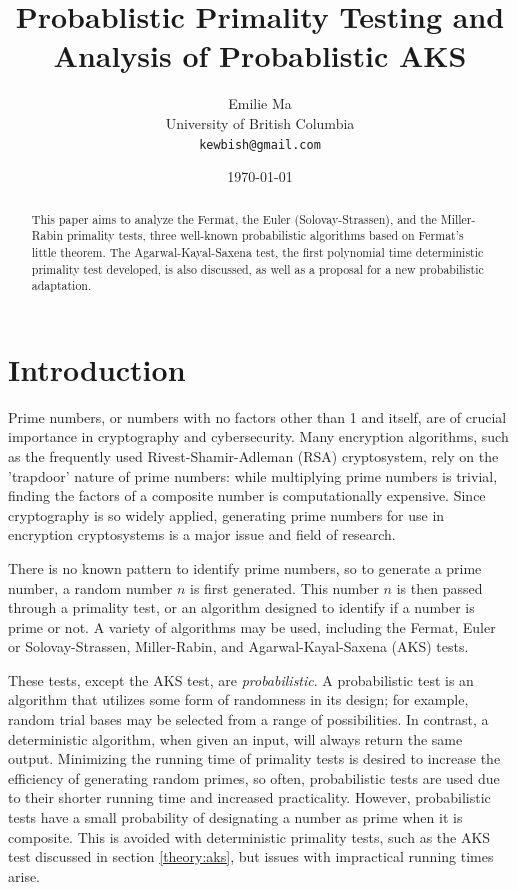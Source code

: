 \documentclass{article}
\title[Primality Testing]{Probablistic Primality Testing and Analysis of Probablistic AKS}
\author[Emilie Ma]{%
Emilie Ma\\%
University of British Columbia\\%
\texttt{kewbish@gmail.com}%
}
\date{\today}
\begin{document}
\maketitle
\newpage
\begin{abstract}
    This paper aims to analyze the Fermat, the Euler (Solovay-Strassen), and the Miller-Rabin primality tests, three well-known probabilistic algorithms based on Fermat's little theorem. The Agarwal-Kayal-Saxena test, the first polynomial time deterministic primality test developed, is also discussed, as well as a proposal for a new probabilistic adaptation.
\end{abstract}

\section{Introduction}
Prime numbers, or numbers with no factors other than 1 and itself, are of crucial importance in cryptography and cybersecurity. Many encryption algorithms, such as the frequently used Rivest-Shamir-Adleman (RSA) cryptosystem, rely on the 'trapdoor' nature of prime numbers: while multiplying prime numbers is trivial, finding the factors of a composite number is computationally expensive. 
Since cryptography is so widely applied, generating prime numbers for use in encryption cryptosystems is a major issue and field of research.

There is no known pattern to identify prime numbers, so to generate a prime number, a random number $n$ is first generated. This number $n$ is then passed through a primality test, or an algorithm designed to identify if a number is prime or not. A variety of algorithms may be used, including the Fermat, Euler or Solovay-Strassen, Miller-Rabin, and Agarwal-Kayal-Saxena (AKS) tests.

These tests, except the AKS test, are \emph{probabilistic}. A probabilistic test is an algorithm that utilizes some form of randomness in its design; for example, random trial bases may be selected from a range of possibilities. In contrast, a deterministic algorithm, when given an input, will always return the same output. Minimizing the running time of primality tests is desired to increase the efficiency of generating random primes, so often, probabilistic tests are used due to their shorter running time and increased practicality. However, probabilistic tests have a small probability of designating a number as prime when it is composite. This is avoided with deterministic primality tests, such as the AKS test discussed in section \ref{theory:aks}, but issues with impractical running times arise.
\end{document}
